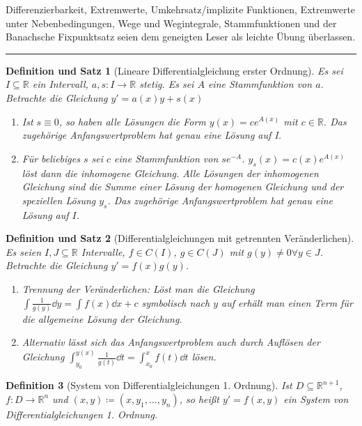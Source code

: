 \documentclass[a4paper]{article}
\newcounter{Sec}
\theoremstyle{marginbreak}
\newtheorem{definition}{Definition}[Sec]
\newtheorem{defsatz}[definition]{Definition und Satz}
\newcommand{\sep}{%
	\rule{\textwidth}{0.3pt}%
	\stepcounter{Sec}%
	}
\begin{document}
		Differenzierbarkeit, Extremwerte, Umkehrsatz/implizite Funktionen, Extremwerte
		unter Nebenbedingungen, Wege und Wegintegrale, Stammfunktionen und der
		Banachsche Fixpunktsatz seien dem geneigten Leser als leichte Übung überlassen.

	\sep
	\begin{defsatz}[Lineare Differentialgleichung erster Ordnung]
		Es sei $I\subseteq\mathbb{R}$ ein Intervall, $a, s\colon I\to\mathbb{R}$ stetig.
		Es sei $A$ eine Stammfunktion von $a$. Betrachte die Gleichung $y' = a(x)y + s(x)$
		\begin{enumerate}[label=(\alph*)]
			\item Ist $s\equiv 0$, so haben alle Lösungen die Form $y(x) = ce^{A(x)}$ mit $c\in\mathbb{R}$.
				Das zugehörige Anfangswertproblem hat genau eine Lösung auf I.
			\item Für beliebiges $s$ sei $c$ eine Stammfunktion von $se^{-A}$.
				$y_s(x) = c(x)e^{A(x)}$ löst dann die inhomogene Gleichung. Alle
				Lösungen der inhomogenen Gleichung sind die Summe einer Lösung der homogenen
				Gleichung und der speziellen Lösung $y_s$. Das zugehörige Anfangswertproblem
				hat genau eine Lösung auf $I$.
		\end{enumerate}
	\end{defsatz}
	\begin{defsatz}[Differentialgleichungen mit getrennten Veränderlichen]
		Es seien $I, J\subseteq\mathbb{R}$ Intervalle, $f\in C(I)$, $g\in C(J)$ mit $g(y)\neq 0\forall y\in J$.
		Betrachte die Gleichung $y' = f(x)g(y)$.
		\begin{enumerate}[label=(\alph*)]
			\item Trennung der Veränderlichen: Löst man die Gleichung
				$\int \frac{1}{g(y)}\dd{y} = \int f(x)\dd{x}+c$ symbolisch nach $y$ auf erhält man einen Term für
				die allgemeine Lösung der Gleichung.
			\item Alternativ lässt sich das Anfangswertproblem auch durch Auflösen der Gleichung
				$\int_{y_0}^{y(x)}\frac{1}{g(t)}\dd{t} = \int_{x_0}^x f(t)\dd{t}$ lösen.
		\end{enumerate}
	\end{defsatz}
	\begin{definition}[System von Differentialgleichungen 1. Ordnung]
		Ist $D\subseteq\mathbb{R}^{n+1}$, $f\colon D\to\mathbb{R}^n$ und
		$(x, y)\coloneqq (x, y_1, \ldots, y_n)$, so heißt $y' = f(x, y)$ ein System
		von Differentialgleichungen 1. Ordnung.
	\end{definition}
\end{document}
